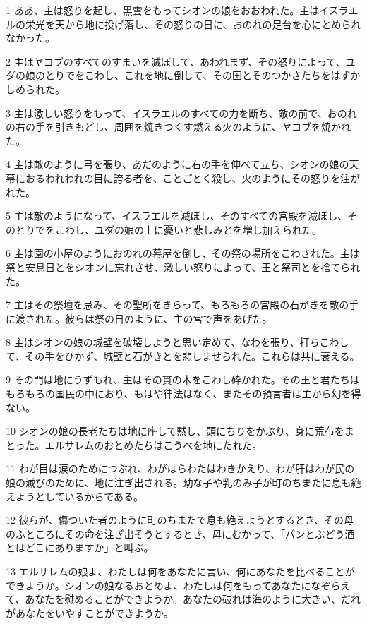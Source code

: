 \par 1 ああ、主は怒りを起し、黒雲をもってシオンの娘をおおわれた。主はイスラエルの栄光を天から地に投げ落し、その怒りの日に、おのれの足台を心にとめられなかった。
\par 2 主はヤコブのすべてのすまいを滅ぼして、あわれまず、その怒りによって、ユダの娘のとりでをこわし、これを地に倒して、その国とそのつかさたちをはずかしめられた。
\par 3 主は激しい怒りをもって、イスラエルのすべての力を断ち、敵の前で、おのれの右の手を引きもどし、周囲を焼きつくす燃える火のように、ヤコブを焼かれた。
\par 4 主は敵のように弓を張り、あだのように右の手を伸べて立ち、シオンの娘の天幕におるわれわれの目に誇る者を、ことごとく殺し、火のようにその怒りを注がれた。
\par 5 主は敵のようになって、イスラエルを滅ぼし、そのすべての宮殿を滅ぼし、そのとりでをこわし、ユダの娘の上に憂いと悲しみとを増し加えられた。
\par 6 主は園の小屋のようにおのれの幕屋を倒し、その祭の場所をこわされた。主は祭と安息日とをシオンに忘れさせ、激しい怒りによって、王と祭司とを捨てられた。
\par 7 主はその祭壇を忌み、その聖所をきらって、もろもろの宮殿の石がきを敵の手に渡された。彼らは祭の日のように、主の宮で声をあげた。
\par 8 主はシオンの娘の城壁を破壊しようと思い定めて、なわを張り、打ちこわして、その手をひかず、城壁と石がきとを悲しませられた。これらは共に衰える。
\par 9 その門は地にうずもれ、主はその貫の木をこわし砕かれた。その王と君たちはもろもろの国民の中におり、もはや律法はなく、またその預言者は主から幻を得ない。
\par 10 シオンの娘の長老たちは地に座して黙し、頭にちりをかぶり、身に荒布をまとった。エルサレムのおとめたちはこうべを地にたれた。
\par 11 わが目は涙のためにつぶれ、わがはらわたはわきかえり、わが肝はわが民の娘の滅びのために、地に注ぎ出される。幼な子や乳のみ子が町のちまたに息も絶えようとしているからである。
\par 12 彼らが、傷ついた者のように町のちまたで息も絶えようとするとき、その母のふところにその命を注ぎ出そうとするとき、母にむかって、「パンとぶどう酒とはどこにありますか」と叫ぶ。
\par 13 エルサレムの娘よ、わたしは何をあなたに言い、何にあなたを比べることができようか。シオンの娘なるおとめよ、わたしは何をもってあなたになぞらえて、あなたを慰めることができようか。あなたの破れは海のように大きい、だれがあなたをいやすことができようか。
